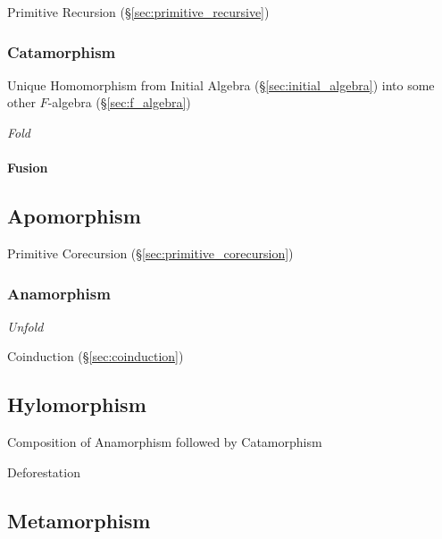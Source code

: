 Primitive Recursion (\S\ref{sec:primitive_recursive})



\subsubsection{Catamorphism}\label{sec:catamorphism}

Unique Homomorphism from Initial Algebra (\S\ref{sec:initial_algebra})
into some other $F$-algebra (\S\ref{sec:f_algebra})

\emph{Fold}



\paragraph{Fusion}\label{sec:fusion}



\subsection{Apomorphism}\label{sec:apomorphism}

Primitive Corecursion (\S\ref{sec:primitive_corecursion})



\subsubsection{Anamorphism}\label{sec:anamorphism}

\emph{Unfold}

Coinduction (\S\ref{sec:coinduction})



\subsection{Hylomorphism}\label{sec:hylomorphism}

Composition of Anamorphism followed by Catamorphism

Deforestation



\subsection{Metamorphism}\label{sec:metamorphism}

